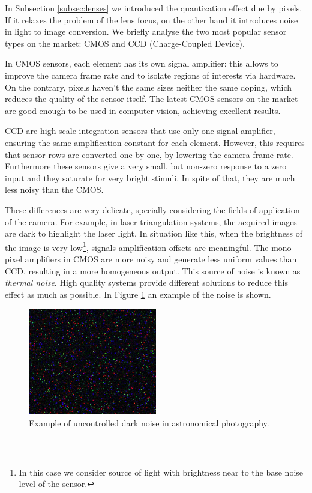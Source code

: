 In Subsection \ref{subsec:lenses} we introduced the quantization effect due by pixels. If it relaxes the problem of the lens focus, on the other hand it introduces noise in light to image conversion. We briefly analyse the two most popular sensor types on the market: \acs{CMOS} and \acs{CCD} (Charge-Coupled Device).

In \acs{CMOS} sensors, each element has its own signal amplifier: this allows to improve the camera frame rate and to isolate regions of interests via hardware. On the contrary, pixels haven't the same sizes neither the same doping, which reduces the quality of the sensor itself. The latest CMOS sensors on the market are good enough to be used in computer vision, achieving excellent results.

\acs{CCD} are high-scale integration sensors that use only one signal amplifier, ensuring the same amplification constant for each element. However, this requires that sensor rows are converted one by one, by lowering the camera frame rate. Furthermore these sensors give a very small, but non-zero response to a zero input and they saturate for very bright stimuli. In spite of that, they are much less noisy than the CMOS.

These differences are very delicate, specially considering the fields of application of the camera. For example, in laser triangulation systems, the acquired images are dark to highlight the laser light. In situation like this, when the brightness of the image is very low\footnote{In this case we consider source of light with brightness near to the base noise level of the sensor.}, signals amplification offsets are meaningful. The mono-pixel amplifiers in \acs{CMOS} are more noisy and generate less uniform values than \acs{CCD}, resulting in a more homogeneous output. This source of noise is known as \textit{thermal noise}. High quality systems provide different solutions to reduce this effect as much as possible. In Figure \ref{fig:thermal-noise} an example of the noise is shown.
  \begin{figure}[h!]
    \centering
    \includegraphics[width=0.5\textwidth]{./images/tech/dark-example.jpg}
    \caption{Example of uncontrolled dark noise in astronomical photography.}
    \label{fig:thermal-noise}
  \end{figure} \\

